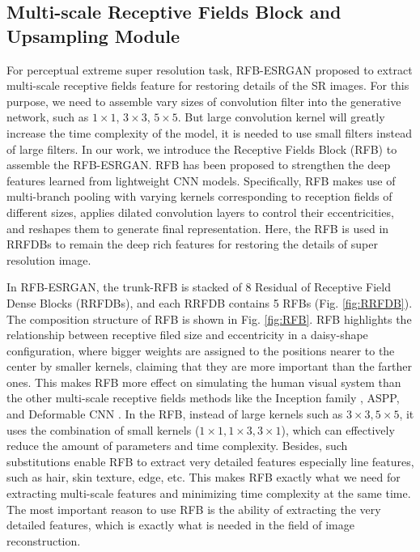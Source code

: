 \documentclass[10pt,twocolumn,letterpaper]{article}
\begin{document}
\subsection{Multi-scale Receptive Fields Block and Upsampling Module}
For perceptual extreme super resolution task, RFB-ESRGAN proposed to extract  multi-scale receptive fields feature for restoring details of the SR images. For this purpose, we need to assemble vary sizes of convolution filter into the generative network, such as $1 \times 1$, $3 \times 3$, $5 \times 5$. But large convolution kernel will greatly increase the time complexity of the model, it is needed to use small filters instead of large filters. In our work, we introduce the Receptive Fields Block (RFB) \cite{liu2018receptive} to assemble the RFB-ESRGAN. RFB has been proposed to strengthen the deep features learned from lightweight CNN models. Specifically, RFB makes use of multi-branch pooling with varying kernels corresponding to reception fields of different sizes, applies dilated convolution layers to control their eccentricities, and reshapes them to generate final representation. Here, the RFB is used in RRFDBs to remain the deep rich features for restoring the details of super resolution image.

In RFB-ESRGAN, the trunk-RFB is stacked of 8 Residual of Receptive Field Dense Blocks (RRFDBs), and each RRFDB contains 5 RFBs (Fig. \ref{fig:RRFDB}). The composition structure of RFB is shown in Fig. \ref{fig:RFB}. RFB highlights the relationship between receptive filed size and eccentricity in a daisy-shape configuration, where bigger weights are assigned to the positions nearer to the center by smaller kernels, claiming that they are more important than the farther ones. This makes RFB more effect on simulating the human visual system than the other multi-scale receptive fields methods like the Inception family \cite{szegedy2015going}, ASPP\cite{chen2017rethinking}, and Deformable CNN \cite{dai2017deformable}. In the RFB, instead of large kernels such as $3 \times 3, 5 \times 5$, it uses the combination of small kernels ($1 \times 1, 1 \times 3, 3 \times 1$), which can effectively reduce the amount of parameters and time complexity. Besides, such substitutions enable RFB to extract very detailed features especially line features, such as hair, skin texture, edge, etc. This makes RFB exactly what we need for extracting multi-scale features and minimizing time complexity at the same time. The most important reason to use RFB is the ability of extracting the very detailed features, which is exactly what is needed in the field of image reconstruction.
\end{document}
